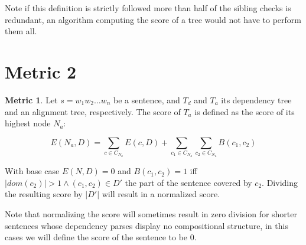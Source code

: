 \documentclass{report}
\theoremstyle{definition}
\newtheorem{metric}{Metric}
\theoremstyle{plain}
\begin{document}
\noindent  Note if this definition is strictly followed more than half of the sibling checks is redundant, an algorithm computing the score of a tree would not have to perform them all.

\section{Metric 2}

\begin{metric}\label{m2}
Let $s = w_1 w_2 \dots w_n$ be a sentence, and $T_d$ and $T_a$ its dependency tree and an alignment tree, respectively. The score of $T_a$ is defined as the score of its highest node $N_{a}$:

$$
E(N_a,D) = \sum_{c\in C_{N_a}} E(c,D)+ \sum_{c_1\in C_{N_a}} \sum_{c_2\in C_{N_a}} B(c_1,c_2)
$$

\noindent With base case $E(N,D) = 0$ and $B(c_1,c_2) = 1$ iff  $|dom(c_2)| > 1 \land (c_1,c_2)\in D'$ the part of the sentence covered by $c_2$. Dividing the resulting score by $|D'|$ will result in a normalized score.
\end{metric}

Note that normalizing the score will sometimes result in zero division for shorter sentences whose dependency parses display no compositional structure, in this cases we will define the score of the sentence to be 0.
















\end{document}
